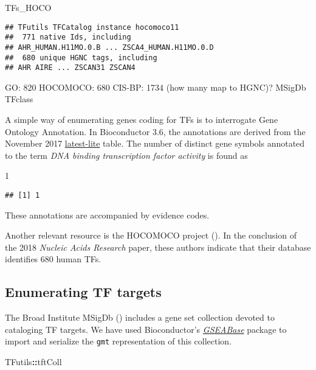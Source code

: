 \documentclass[9pt,a4paper,]{extarticle}
\newenvironment{Shaded}{\begin{snugshade}}{\end{snugshade}}
\newcommand{\DecValTok}[1]{\textcolor[rgb]{0.00,0.00,0.81}{#1}}
\newcommand{\OperatorTok}[1]{\textcolor[rgb]{0.81,0.36,0.00}{\textbf{#1}}}
\newcommand{\NormalTok}[1]{#1}
\begin{document}
\begin{Shaded}
\begin{Highlighting}[]
\NormalTok{TFs_HOCO}
\end{Highlighting}
\end{Shaded}

\begin{verbatim}
## TFutils TFCatalog instance hocomoco11 
##  771 native Ids, including
## AHR_HUMAN.H11MO.0.B ... ZSCA4_HUMAN.H11MO.0.D 
##  680 unique HGNC tags, including
## AHR AIRE ... ZSCAN31 ZSCAN4
\end{verbatim}

GO: 820
HOCOMOCO: 680
CIS-BP: 1734 (how many map to HGNC)?
MSigDb
TFclass

A simple way of enumerating genes coding for TFs
is to interrogate Gene Ontology Annotation. In Bioconductor 3.6,
the annotations are derived from the November 2017
\href{ftp://ftp.geneontology.org/pub/go/godatabase/archive/latest-lite/}{latest-lite} table. The number of distinct gene symbols annotated to
the term \emph{DNA binding transcription factor activity} is found as

\begin{Shaded}
\begin{Highlighting}[]
\DecValTok{1}
\end{Highlighting}
\end{Shaded}

\begin{verbatim}
## [1] 1
\end{verbatim}

These annotations are accompanied by evidence codes.

Another relevant resource is the HOCOMOCO project (\citet{Kulakovskiy2018}).
In the conclusion of the 2018 \emph{Nucleic Acids Research} paper,
these authors indicate that their database identifies 680
human TFs.

\subsection{Enumerating TF targets}\label{enumerating-tf-targets}

The Broad Institute MSigDb (\citet{Subramanian15545}) includes
a gene set collection devoted to cataloging TF targets.
We have used Bioconductor's \emph{\href{http://bioconductor.org/packages/GSEABase}{GSEABase}} package
to import and serialize the \texttt{gmt} representation of this
collection.

\begin{Shaded}
\begin{Highlighting}[]
\NormalTok{TFutils}\OperatorTok{::}\NormalTok{tftColl}
\end{Highlighting}
\end{Shaded}
\end{document}
